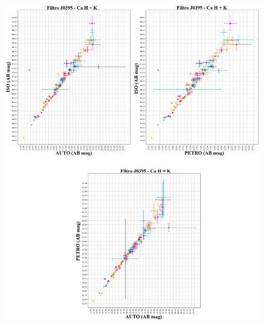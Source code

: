 \begin{anexosenv}
    \begin{figure}[h]
        \centering
        \includegraphics[width=1.0\textwidth]{Imagens/J0395_iso_auto.png}
        \caption[]{}
        \label{fig:J0395_iso_auto} 
    \end{figure}


\end{anexosenv}
